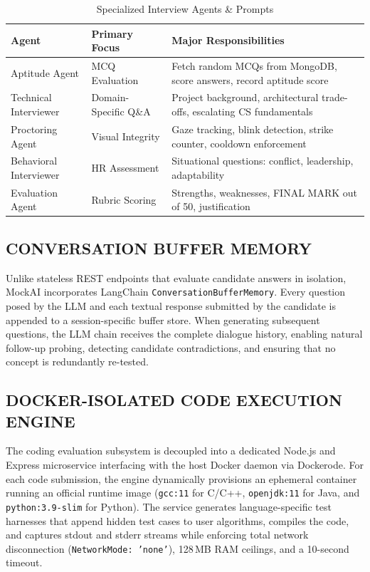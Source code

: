 \documentclass[12pt,a4paper]{report}
\begin{document}
\begin{table}[htbp]
  \centering
  \caption{Specialized Interview Agents \& Prompts}
  \label{tab:agents}
  \renewcommand{\arraystretch}{1.3}
  \begin{tabular}{p{3.5cm} p{3.5cm} p{6cm}}
    \toprule
    \textbf{Agent} & \textbf{Primary Focus} & \textbf{Major Responsibilities} \\
    \midrule
    Aptitude Agent &
      MCQ Evaluation &
      Fetch random MCQs from MongoDB, score answers, record aptitude score \\
    \addlinespace
    Technical Interviewer &
      Domain-Specific Q\&A &
      Project background, architectural trade-offs, escalating CS fundamentals \\
    \addlinespace
    Proctoring Agent &
      Visual Integrity &
      Gaze tracking, blink detection, strike counter, cooldown enforcement \\
    \addlinespace
    Behavioral Interviewer &
      HR Assessment &
      Situational questions: conflict, leadership, adaptability \\
    \addlinespace
    Evaluation Agent &
      Rubric Scoring &
      Strengths, weaknesses, FINAL MARK out of 50, justification \\
    \bottomrule
  \end{tabular}
\end{table}

\subsection{CONVERSATION BUFFER MEMORY}

Unlike stateless REST endpoints that evaluate candidate answers in isolation, MockAI
incorporates LangChain \texttt{ConversationBufferMemory}. Every question posed by the
LLM and each textual response submitted by the candidate is appended to a
session-specific buffer store. When generating subsequent questions, the LLM chain
receives the complete dialogue history, enabling natural follow-up probing, detecting
candidate contradictions, and ensuring that no concept is redundantly re-tested.

\subsection{DOCKER-ISOLATED CODE EXECUTION ENGINE}

The coding evaluation subsystem is decoupled into a dedicated Node.js and Express
microservice interfacing with the host Docker daemon via Dockerode. For each code
submission, the engine dynamically provisions an ephemeral container running an official
runtime image (\texttt{gcc:11} for C/C++, \texttt{openjdk:11} for Java, and
\texttt{python:3.9-slim} for Python). The service generates language-specific test harnesses
that append hidden test cases to user algorithms, compiles the code, and captures stdout
and stderr streams while enforcing total network disconnection
(\texttt{NetworkMode: 'none'}), 128\,MB RAM ceilings, and a 10-second timeout.
\end{document}
